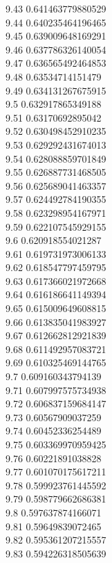 {9.43	0.641463779880529\\
9.44	0.640235464196465\\
9.45	0.639009648169291\\
9.46	0.637786326140054\\
9.47	0.636565492464853\\
9.48	0.63534714151479\\
9.49	0.634131267675915\\
9.5	0.632917865349188\\
9.51	0.63170692895042\\
9.52	0.630498452910235\\
9.53	0.629292431674013\\
9.54	0.628088859701849\\
9.55	0.626887731468505\\
9.56	0.625689041463357\\
9.57	0.624492784190355\\
9.58	0.623298954167971\\
9.59	0.622107545929155\\
9.6	0.620918554021287\\
9.61	0.619731973006133\\
9.62	0.618547797459795\\
9.63	0.617366021972668\\
9.64	0.616186641149394\\
9.65	0.615009649608815\\
9.66	0.613835041983927\\
9.67	0.612662812921839\\
9.68	0.611492957083721\\
9.69	0.610325469144765\\
9.7	0.609160343794139\\
9.71	0.607997575734938\\
9.72	0.606837159684147\\
9.73	0.60567909037259\\
9.74	0.60452336254489\\
9.75	0.603369970959425\\
9.76	0.60221891038828\\
9.77	0.601070175617211\\
9.78	0.599923761445592\\
9.79	0.598779662686381\\
9.8	0.597637874166071\\
9.81	0.59649839072465\\
9.82	0.595361207215557\\
9.83	0.594226318505639\\
}
